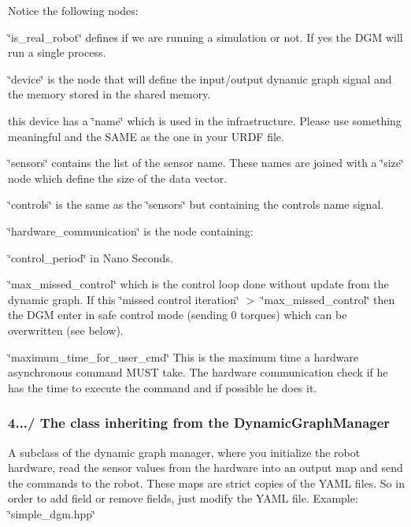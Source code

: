 Notice the following nodes\+:
\begin{DoxyItemize}
\item \char`\"{}is\+\_\+real\+\_\+robot\char`\"{} defines if we are running a simulation or not. If yes the D\+GM will run a single process.
\item \char`\"{}device\char`\"{} is the node that will define the input/output dynamic graph signal and the memory stored in the shared memory.
\begin{DoxyItemize}
\item this device has a \char`\"{}name\char`\"{} which is used in the infrastructure. Please use something meaningful and the S\+A\+ME as the one in your U\+R\+DF file.
\item \char`\"{}sensors\char`\"{} contains the list of the sensor name. These names are joined with a \char`\"{}size\char`\"{} node which define the size of the data vector.
\item \char`\"{}controls\char`\"{} is the same as the \char`\"{}sensors\char`\"{} but containing the controls name signal.
\end{DoxyItemize}
\item \char`\"{}hardware\+\_\+communication\char`\"{} is the node containing\+:
\begin{DoxyItemize}
\item \char`\"{}control\+\_\+period\char`\"{} in Nano Seconds.
\item \char`\"{}max\+\_\+missed\+\_\+control\char`\"{} which is the control loop done without update from the dynamic graph. If this \char`\"{}missed control iteration\char`\"{} $>$ \char`\"{}max\+\_\+missed\+\_\+control\char`\"{} then the D\+GM enter in safe control mode (sending 0 torques) which can be overwritten (see below).
\item \char`\"{}maximum\+\_\+time\+\_\+for\+\_\+user\+\_\+cmd\char`\"{} This is the maximum time a hardware asynchronous command M\+U\+ST take. The hardware communication check if he has the time to execute the command and if possible he does it.
\end{DoxyItemize}
\end{DoxyItemize}\hypertarget{subsubpage_implement_dgm_dgm_impl_sec_hineritance}{}\subsubsection{4.../ The class inheriting from the Dynamic\+Graph\+Manager}\label{subsubpage_implement_dgm_dgm_impl_sec_hineritance}
A subclass of the dynamic graph manager, where you initialize the robot hardware, read the sensor values from the hardware into an output map and send the commands to the robot. These maps are strict copies of the Y\+A\+ML files. So in order to add field or remove fields, just modify the Y\+A\+ML file. Example\+: \char`\"{}simple\+\_\+dgm.\+hpp\char`\"{}

